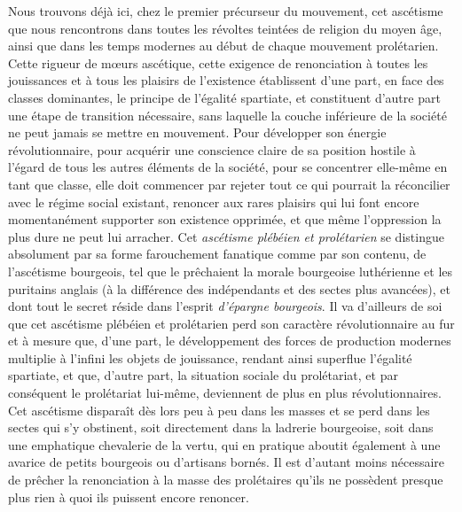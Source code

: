 \documentclass[french,twoside]{book} %
\begin{document}
Nous trouvons déjà ici, chez le premier précurseur du mouvement, cet ascétisme que nous rencontrons dans toutes les révoltes teintées de religion du moyen âge, ainsi que dans les temps modernes au début de chaque mouvement prolétarien. Cette rigueur de mœurs ascétique, cette exigence de renonciation à toutes les jouissances et à tous les plaisirs de l’existence établissent d’une part, en face des classes dominantes, le principe de l’égalité spartiate, et constituent d’autre part une étape de transition nécessaire, sans laquelle la couche inférieure de la société ne peut jamais se mettre en mouvement. Pour développer son énergie révolutionnaire, pour acquérir une conscience claire de sa position hostile à l’égard de tous les autres éléments de la société, pour se concentrer elle-même en tant que classe, elle doit commencer par rejeter tout ce qui pourrait la réconcilier avec le régime social existant, renoncer aux rares plaisirs qui lui font encore momentanément supporter son existence opprimée, et que même l’oppression la plus dure ne peut lui arracher. Cet \emph{ascétisme plébéien et prolétarien} se distingue absolument par sa forme farouchement fanatique comme par son contenu, de l’ascétisme bourgeois, tel que le prêchaient la morale bourgeoise luthérienne et les puritains anglais (à la différence des indépendants et des sectes plus avancées), et dont tout le secret réside dans l’esprit \emph{d’épargne bourgeois}. Il va d’ailleurs de soi que cet ascétisme plébéien et prolétarien perd son caractère révolutionnaire au fur et à mesure que, d’une part, le développement des forces de production modernes multiplie à l’infini les objets de jouissance, rendant ainsi superflue l’égalité spartiate, et que, d’autre part, la situation sociale du prolétariat, et par conséquent le prolétariat lui-même, deviennent de plus en plus révolutionnaires. Cet ascétisme disparaît dès lors peu à peu dans les masses et se perd dans les sectes qui s’y obstinent, soit directement dans la ladrerie bourgeoise, soit dans une emphatique chevalerie de la vertu, qui en pratique aboutit également à une avarice de petits bourgeois ou d’artisans bornés. Il est d’autant moins nécessaire de prêcher la renonciation à la masse des prolétaires qu’ils ne possèdent presque plus rien à quoi ils puissent encore renoncer.\par
\end{document}
